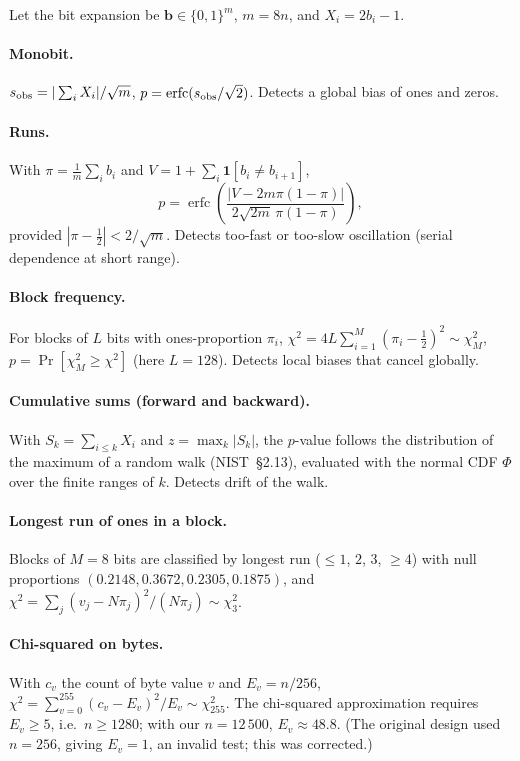 \documentclass[11pt,a4paper]{article}
\theoremstyle{plain}
\theoremstyle{definition}
\DeclareMathOperator{\erfc}{erfc}
\begin{document}
Let the bit expansion be $\mathbf{b}\in\{0,1\}^m$, $m=8n$, and
$X_i=2b_i-1$.

\paragraph{Monobit.} $s_{\rm obs}=|\sum_iX_i|/\sqrt m$, $p=\erfc(s_{\rm obs}/\sqrt2)$.
Detects a global bias of ones and zeros.

\paragraph{Runs.} With $\pi=\frac1m\sum_ib_i$ and
$V=1+\sum_{i}\mathbf{1}[b_i\ne b_{i+1}]$,
\begin{equation}
    p=\erfc\!\left(\frac{|V-2m\pi(1-\pi)|}{2\sqrt{2m}\,\pi(1-\pi)}\right),
\end{equation}
provided $|\pi-\frac12|<2/\sqrt m$. Detects too-fast or too-slow oscillation
(serial dependence at short range).

\paragraph{Block frequency.} For blocks of $L$ bits with ones-proportion $\pi_i$,
$\chi^2=4L\sum_{i=1}^{M}(\pi_i-\frac12)^2\sim\chi^2_M$, $p=\Pr[\chi^2_M\ge\chi^2]$
(here $L=128$). Detects local biases that cancel globally.

\paragraph{Cumulative sums (forward and backward).} With $S_k=\sum_{i\le k}X_i$
and $z=\max_k|S_k|$, the $p$-value follows the distribution of the maximum of
a random walk (NIST~\S2.13), evaluated with the normal CDF $\Phi$ over the
finite ranges of $k$. Detects drift of the walk.

\paragraph{Longest run of ones in a block.} Blocks of $M=8$ bits are classified
by longest run ($\le1$, $2$, $3$, $\ge4$) with null proportions
$(0.2148,0.3672,0.2305,0.1875)$, and
$\chi^2=\sum_j(v_j-N\pi_j)^2/(N\pi_j)\sim\chi^2_3$.

\paragraph{Chi-squared on bytes.} With $c_v$ the count of byte value $v$ and
$E_v=n/256$,
$\chi^2=\sum_{v=0}^{255}(c_v-E_v)^2/E_v\sim\chi^2_{255}$. The chi-squared
approximation requires $E_v\ge5$, i.e.\ $n\ge1280$; with our $n=12\,500$,
$E_v\approx48.8$. (The original design used $n=256$, giving $E_v=1$, an invalid
test; this was corrected.)
\end{document}
